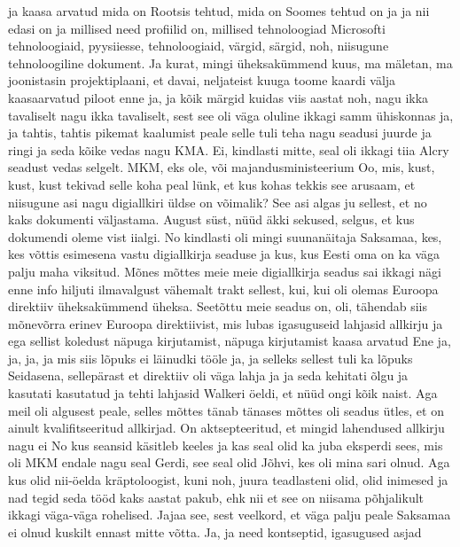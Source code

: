 ja kaasa arvatud mida on Rootsis tehtud, mida on Soomes tehtud on ja ja nii edasi on ja millised need profiilid on, millised tehnoloogiad Microsofti tehnoloogiaid, pyysiiesse, tehnoloogiaid, värgid, särgid, noh, niisugune tehnoloogiline dokument. Ja kurat, mingi üheksakümmend kuus, ma mäletan, ma joonistasin projektiplaani, et davai, neljateist kuuga toome kaardi välja kaasaarvatud piloot enne ja, ja kõik märgid kuidas viis aastat noh, nagu ikka tavaliselt nagu ikka tavaliselt, sest see oli väga oluline ikkagi samm ühiskonnas ja, ja tahtis, tahtis pikemat kaalumist peale selle tuli teha nagu seadusi juurde ja ringi ja seda kõike vedas nagu KMA. Ei, kindlasti mitte, seal oli ikkagi tiia Alcry seadust vedas selgelt. MKM, eks ole, või majandusministeerium Oo, mis, kust, kust, kust tekivad selle koha peal lünk, et kus kohas tekkis see arusaam, et niisugune asi nagu digiallkiri üldse on võimalik? See asi algas ju sellest, et no kaks dokumenti väljastama. August süst, nüüd äkki sekused, selgus, et kus dokumendi oleme vist iialgi.
No kindlasti oli mingi suunanäitaja Saksamaa, kes, kes võttis esimesena vastu digiallkirja seaduse ja kus, kus Eesti oma on ka väga palju maha viksitud. Mõnes mõttes meie meie digiallkirja seadus sai ikkagi nägi enne info hiljuti ilmavalgust vähemalt trakt sellest, kui, kui oli olemas Euroopa direktiiv üheksakümmend üheksa. Seetõttu meie seadus on, oli, tähendab siis mõnevõrra erinev Euroopa direktiivist, mis lubas igasuguseid lahjasid allkirju ja ega sellist koledust näpuga kirjutamist, näpuga kirjutamist kaasa arvatud Ene ja, ja, ja, ja mis siis lõpuks ei läinudki tööle ja, ja selleks sellest tuli ka lõpuks Seidasena, sellepärast et direktiiv oli väga lahja ja ja seda kehitati õlgu ja kasutati kasutatud ja tehti lahjasid Walkeri öeldi, et nüüd ongi kõik naist. Aga meil oli algusest peale, selles mõttes tänab tänases mõttes oli seadus ütles, et on ainult kvalifitseeritud allkirjad. On aktsepteeritud, et mingid lahendused allkirju nagu ei No kus seansid käsitleb keeles ja kas seal olid ka juba eksperdi sees, mis oli MKM endale nagu seal Gerdi, see seal olid Jõhvi, kes oli mina sari olnud. Aga kus olid nii-öelda kräptoloogist, kuni noh, juura teadlasteni olid, olid inimesed ja nad tegid seda tööd kaks aastat pakub, ehk nii et see on niisama põhjalikult ikkagi väga-väga rohelised. Jajaa see, sest veelkord, et väga palju peale Saksamaa ei olnud kuskilt ennast mitte võtta. Ja, ja need kontseptid, igasugused asjad
